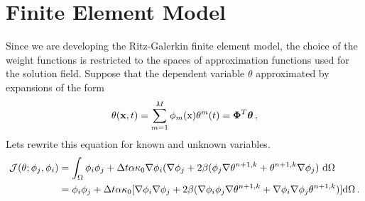 \documentclass[]{article}
\begin{document}
\section{Finite Element Model} \label{sec: fem}
Since we are developing the Ritz-Galerkin finite element model, the choice of the weight functions is restricted to the spaces of approximation functions used for the solution field. Suppose that the dependent variable $\theta$ approximated by expansions of the form
\begin{equation}\label{eq11}
	\begin{aligned}
		\theta(\mathbf{x}, t)= \sum_{m=1}^{M} \phi_m(\mathrm{x}) \mathbf{\theta}^m(t) = \boldsymbol{\Phi}^T\boldsymbol{\theta} \thinspace,
	\end{aligned}
\end{equation}
Lets rewrite this equation for known and unknown variables.
\begin{equation}\label{eq11}
	\begin{aligned}
		\mathcal{J}(\theta;\phi_j,\phi_i)&= \int_{\Omega} \phi_i \phi_j + \Delta t \alpha \kappa_0 \nabla \phi_i (\nabla \phi_j + 2 \beta (\phi_j \nabla \theta ^{n+1,k}+\theta^{n+1,k}\nabla \phi_j) \ \mathrm{d} \Omega \\
		&= \phi_i \phi_j + \Delta t \alpha \kappa_0[\nabla \phi_i\nabla \phi_j + 2 \beta(\nabla \phi_i\phi_j  \nabla \theta^{n+1,k} + \nabla \phi_i\nabla \phi_j\theta^{n+1,k} ) ]\mathrm{d} \Omega\thinspace.
	\end{aligned}
\end{equation}
\end{document}

